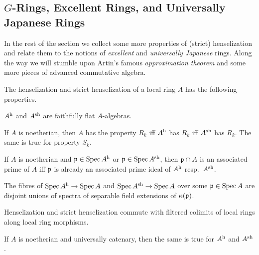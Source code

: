 \documentclass[a4paper, 10pt, oneside, DIV=9, chapterprefix=true, numbers=enddot, bibliography=totoc]{scrbook}
\begin{document}
\subsection{\texorpdfstring{$G$}{G}-Rings, Excellent Rings, and Universally Japanese Rings}
In the rest of the section we collect some more properties of (strict) henselization and relate them to the notions of \emph{excellent} and \emph{universally Japanese} rings. Along the way we will stumble upon Artin's famous \emph{approximation theorem} and some more pieces of advanced commutative algebra.
\begin{fact}\label{fact:moarHenselization}
	The henselization and strict henselization of a local ring $A$ has the following properties.
	\begin{alphanumerate}
		\item $A^{\mathrm{h}}$ and $A^{\mathrm{sh}}$ are faithfully flat $A$-algebras.
		\item If $A$ is noetherian, then $A$ has the property $R_k$ iff $A^{\mathrm{h}}$ has $R_k$ iff $A^{\mathrm{sh}}$ has $R_k$. The same is true for property $S_k$.
		\item If $A$ is noetherian and $\mathfrak{p}\in \operatorname{Spec} A^{\mathrm{h}}$ or $\mathfrak{p}\in\operatorname{Spec} A^{\mathrm{sh}}$, then $\mathfrak{p}\cap A$ is an associated prime of $A$ iff $\mathfrak{p}$ is already an associated prime ideal of $A^{\mathrm{h}}$ resp.\ $A^{\mathrm{sh}}$.
		\item The fibres of $\Spec A^\h\morphism \Spec A$ and $\Spec A^\sh\morphism \Spec A$ over some $\mathfrak{p}\in \operatorname{Spec} A$ are disjoint unions of spectra of separable field extensions of $\kappa(\mathfrak{p})$.
		\item Henselization and strict henselization commute with filtered colimits of local rings along local ring morphisms.
		\item If $A$ is noetherian and universally catenary, then the same is true for $A^{\mathrm{h}}$ and $A^{\mathrm{sh}}$.
	\end{alphanumerate}
\end{fact}
\end{document}
